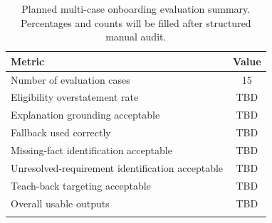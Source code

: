 \begin{table}[t]
\centering
\caption{Planned multi-case onboarding evaluation summary. Percentages and counts will be filled after structured manual audit.}
\label{tab:onboarding_eval_results}
\begin{tabular}{lc}
\toprule
Metric & Value \\
\midrule
Number of evaluation cases & 15 \\
Eligibility overstatement rate & TBD \\
Explanation grounding acceptable & TBD \\
Fallback used correctly & TBD \\
Missing-fact identification acceptable & TBD \\
Unresolved-requirement identification acceptable & TBD \\
Teach-back targeting acceptable & TBD \\
Overall usable outputs & TBD \\
\botrule
\end{tabular}
\end{table}
